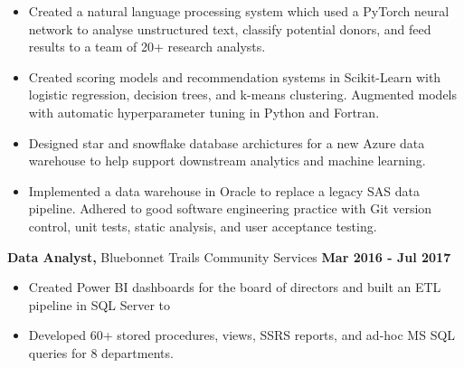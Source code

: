 \documentclass [
        11pt
] {article}
\begin{document}
\begin{itemize}[itemsep=1pt,topsep=1pt]
\renewcommand{\labelitemi}{\scriptsize$\blacksquare$}

\item Created a natural language processing system which used a PyTorch
neural network to analyse unstructured text, classify potential donors, and
feed results to a team of 20+ research analysts.

\item Created scoring models and recommendation systems in Scikit-Learn with
logistic regression, decision trees, and k-means clustering. Augmented models
with automatic hyperparameter tuning in Python and Fortran.

\item Designed star and snowflake database archictures for a new Azure data
warehouse to help support downstream analytics and machine learning.

\item Implemented a data warehouse in Oracle to replace a legacy SAS data
pipeline. Adhered to good software engineering practice with Git version control,
unit tests, static analysis, and user acceptance testing.

\end{itemize}

\vspace*{5pt}




\noindent \textbf{Data Analyst,} Bluebonnet Trails Community Services
\hspace*{\fill} \textbf{Mar 2016 - Jul 2017}

\begin{itemize}[itemsep=1pt,topsep=1pt]
\renewcommand{\labelitemi}{\scriptsize$\blacksquare$}

\item Created Power BI dashboards for the board of directors
and built an ETL pipeline in SQL Server to 

\item Developed 60+ stored procedures, views, SSRS reports, and ad-hoc
MS SQL queries for 8 departments.

\end{itemize}

\vspace*{10pt}

\end{document}
